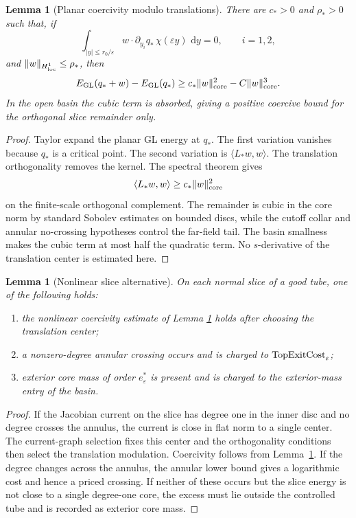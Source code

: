 \documentclass[11pt]{article}
\newtheorem{lemma}[theorem]{Lemma}
\theoremstyle{definition}
\newcommand{\dd}{\,\mathrm d}
\newcommand{\eps}{\varepsilon}
\newcommand{\estar}{e_\varepsilon^\ast}
\begin{document}
\begin{lemma}[Planar coercivity modulo translations]
\label{lem:app-planar-coercivity}
There are \(c_\ast>0\) and \(\rho_\ast>0\) such that, if
\[
        \int_{|y|\le r_0/\eps}
        w\cdot\partial_{y_i}q_\ast\,\chi(\eps y)\,\dd y=0,
        \qquad i=1,2,
\]
and \(\|w\|_{H^1_{\rm loc}}\le\rho_\ast\), then
\[
        E_{\rm GL}(q_\ast+w)-E_{\rm GL}(q_\ast)
        \ge
        c_\ast\|w\|_{\rm core}^2
        -
        C\|w\|_{\rm core}^3 .
\]
In the open basin the cubic term is absorbed, giving a positive coercive bound
for the orthogonal slice remainder only.
\end{lemma}

\begin{proof}
Taylor expand the planar GL energy at \(q_\ast\).  The first variation
vanishes because \(q_\ast\) is a critical point.  The second variation is
\(\langle L_\ast w,w\rangle\).  The translation orthogonality removes the
kernel.  The spectral theorem gives
\[
        \langle L_\ast w,w\rangle
        \ge
        c_\ast\|w\|_{\rm core}^2
\]
on the finite-scale orthogonal complement.  The remainder is cubic in the core
norm by standard Sobolev estimates on bounded discs, while the cutoff collar and
annular no-crossing hypotheses control the far-field tail.  The basin smallness
makes the cubic term at most half the quadratic term.  No \(s\)-derivative of
the translation center is estimated here.
\end{proof}

\begin{lemma}[Nonlinear slice alternative]
\label{lem:app-slice-alternative}
On each normal slice of a good tube, one of the following holds:
\begin{enumerate}[label=(\roman*)]
\item the nonlinear coercivity estimate of Lemma
\ref{lem:app-planar-coercivity} holds after choosing the translation center;
\item a nonzero-degree annular crossing occurs and is charged to
\({\rm TopExitCost}_\eps\);
\item exterior core mass of order \(\estar\) is present and is charged to the
exterior-mass entry of the basin.
\end{enumerate}
\end{lemma}

\begin{proof}
If the Jacobian current on the slice has degree one in the inner disc and no
degree crosses the annulus, the current is close in flat norm to a single
center.  The current-graph selection fixes this center and the orthogonality
conditions then select the translation modulation.  Coercivity follows from
Lemma~\ref{lem:app-planar-coercivity}.  If the degree changes across the
annulus, the annular lower bound gives a logarithmic cost and hence a priced
crossing.  If neither of these occurs but the slice energy is not close to a
single degree-one core, the excess must lie outside the controlled tube and is
recorded as exterior core mass.
\end{proof}
\end{document}
